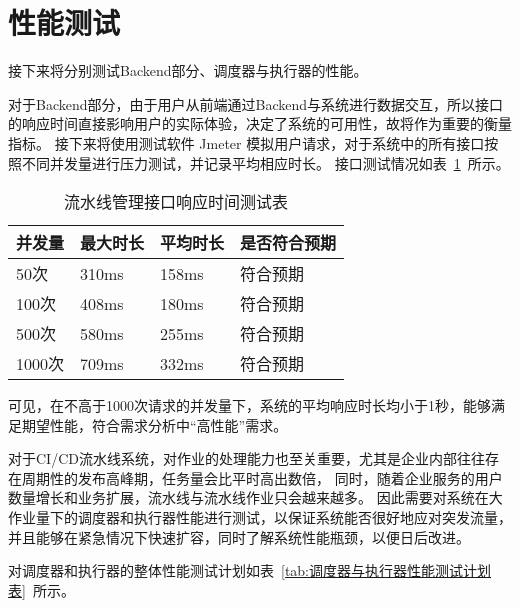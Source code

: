 \section{性能测试}
接下来将分别测试Backend部分、调度器与执行器的性能。

对于Backend部分，由于用户从前端通过Backend与系统进行数据交互，所以接口的响应时间直接影响用户的实际体验，决定了系统的可用性，故将作为重要的衡量指标。
接下来将使用测试软件 Jmeter 模拟用户请求，对于系统中的所有接口按照不同并发量进行压力测试，并记录平均相应时长。
接口测试情况如表~\ref{tab:流水线管理接口响应时间测试表}~所示。

\begin{table}[h]
  \centering
  \caption{流水线管理接口响应时间测试表}
  \label{tab:流水线管理接口响应时间测试表}
  \begin{tabular}{llll}
    \toprule
    并发量         & 最大时长            & 平均时长     & 是否符合预期                       \\
    \midrule
    50次         & 310ms              & 158ms     & 符合预期                 \\
    100次        & 408ms              & 180ms     & 符合预期                 \\
    500次        & 580ms              & 255ms     & 符合预期                     \\
    1000次       & 709ms              & 332ms     & 符合预期                     \\
    \bottomrule
  \end{tabular}
\end{table}

可见，在不高于1000次请求的并发量下，系统的平均响应时长均小于1秒，能够满足期望性能，符合需求分析中“高性能”需求。

对于CI/CD流水线系统，对作业的处理能力也至关重要，尤其是企业内部往往存在周期性的发布高峰期，任务量会比平时高出数倍，
同时，随着企业服务的用户数量增长和业务扩展，流水线与流水线作业只会越来越多。
因此需要对系统在大作业量下的调度器和执行器性能进行测试，以保证系统能否很好地应对突发流量，并且能够在紧急情况下快速扩容，同时了解系统性能瓶颈，以便日后改进。

对调度器和执行器的整体性能测试计划如表~\ref{tab:调度器与执行器性能测试计划表}~所示。

